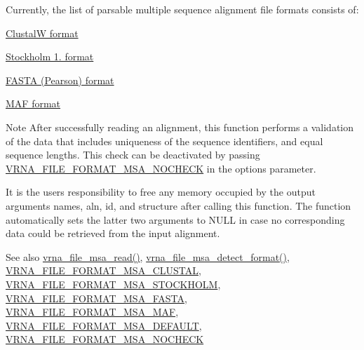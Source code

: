 Currently, the list of parsable multiple sequence alignment file formats consists of\+:
\begin{DoxyItemize}
\item \hyperlink{file_formats_msa-formats-clustal}{ClustalW format}
\item \hyperlink{file_formats_msa-formats-stockholm}{Stockholm 1. format}
\item \hyperlink{file_formats_msa-formats-fasta}{F\+A\+S\+TA (Pearson) format}
\item \hyperlink{file_formats_msa-formats-maf}{M\+AF format}
\end{DoxyItemize}\begin{DoxyNote}{Note}
After successfully reading an alignment, this function performs a validation of the data that includes uniqueness of the sequence identifiers, and equal sequence lengths. This check can be deactivated by passing \hyperlink{group__file__formats__msa_ga229fb3778ecabea4782902b69fa48fd1}{V\+R\+N\+A\+\_\+\+F\+I\+L\+E\+\_\+\+F\+O\+R\+M\+A\+T\+\_\+\+M\+S\+A\+\_\+\+N\+O\+C\+H\+E\+CK} in the {\ttfamily options} parameter.

It is the users responsibility to free any memory occupied by the output arguments {\ttfamily names}, {\ttfamily aln}, {\ttfamily id}, and {\ttfamily structure} after calling this function. The function automatically sets the latter two arguments to {\ttfamily N\+U\+LL} in case no corresponding data could be retrieved from the input alignment.
\end{DoxyNote}
\begin{DoxySeeAlso}{See also}
\hyperlink{group__file__formats__msa_ga08a01c40ac5f5e0e04e9ae2258c99aa6}{vrna\+\_\+file\+\_\+msa\+\_\+read()}, \hyperlink{group__file__formats__msa_ga627ac281b5f11c63861726e6472626c9}{vrna\+\_\+file\+\_\+msa\+\_\+detect\+\_\+format()}, \hyperlink{group__file__formats__msa_ga79a23de2c7249f2cccd762e475c81859}{V\+R\+N\+A\+\_\+\+F\+I\+L\+E\+\_\+\+F\+O\+R\+M\+A\+T\+\_\+\+M\+S\+A\+\_\+\+C\+L\+U\+S\+T\+AL}, \hyperlink{group__file__formats__msa_ga62be992445cd8ab2ad7a8fded944338b}{V\+R\+N\+A\+\_\+\+F\+I\+L\+E\+\_\+\+F\+O\+R\+M\+A\+T\+\_\+\+M\+S\+A\+\_\+\+S\+T\+O\+C\+K\+H\+O\+LM}, \hyperlink{group__file__formats__msa_gacf6274a2c825f34e4131404665b00604}{V\+R\+N\+A\+\_\+\+F\+I\+L\+E\+\_\+\+F\+O\+R\+M\+A\+T\+\_\+\+M\+S\+A\+\_\+\+F\+A\+S\+TA}, \hyperlink{group__file__formats__msa_gab3186d774c01570d2a47d0308eec4927}{V\+R\+N\+A\+\_\+\+F\+I\+L\+E\+\_\+\+F\+O\+R\+M\+A\+T\+\_\+\+M\+S\+A\+\_\+\+M\+AF}, \hyperlink{group__file__formats__msa_ga4acc255373831856a8417b68de8a94c0}{V\+R\+N\+A\+\_\+\+F\+I\+L\+E\+\_\+\+F\+O\+R\+M\+A\+T\+\_\+\+M\+S\+A\+\_\+\+D\+E\+F\+A\+U\+LT}, \hyperlink{group__file__formats__msa_ga229fb3778ecabea4782902b69fa48fd1}{V\+R\+N\+A\+\_\+\+F\+I\+L\+E\+\_\+\+F\+O\+R\+M\+A\+T\+\_\+\+M\+S\+A\+\_\+\+N\+O\+C\+H\+E\+CK}
\end{DoxySeeAlso}

